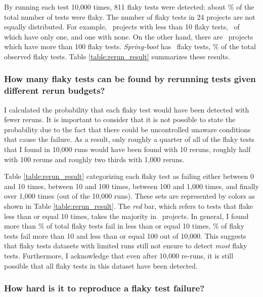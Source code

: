 By running each test 10,000 times, 811 flaky tests were detected: about \flakytestsrate\% of the total number of tests were flaky. The number of flaky tests in 24 projects are not equally distributed. For example, \projectsout~projects with less than 10 flaky tests, \projectsoneflaky~of which have only one, and one with none. On the other hand, there are \projectshundredsflaky~projects which have more than 100 flaky tests. \emph{Spring-boot} has \springbootFlaky~flaky tests, \highestflakyrate\% of the total observed flaky tests. Table \ref{table:rerun_result} summarizes these results. 

\subsubsection{How many flaky tests can be found by rerunning tests given different rerun budgets?} 
\label{FlakeFlaggerRQ1}

I calculated the probability that each flaky test would have been detected with fewer reruns. It is important to consider that it is not possible to state the probability due to the fact that there could be uncontrolled unaware conditions that cause the failure. As a result, only roughly a quarter of all of the flaky tests that I found in 10,000 runs would have been found with 10 reruns, roughly half with 100 reruns and roughly two thirds with 1,000 reruns.

Table \ref{table:rerun_result} categorizing each flaky test as failing either between 0 and 10 times, between 10 and 100 times, between 100 and 1,000 times, and finally over 1,000 times (out of the 10,000 runs).
These sets are represented by colors as shown in Table \ref{table:rerun_result}. The \emph{red} bar, which refers to tests that flake less than or equal 10 times, takes the majority in \redbarsratio~projects. 
In general, I found more than \NumFailingRunsTen\% of total flaky tests fail in less than or equal 10 times, \NumFailingRunsHundred\% of flaky tests fail more than 10 and less than or equal 100 out of 10,000.
This suggests that flaky tests datasets with limited runs still not ensure to detect \emph{most} flaky tests.
Furthermore, I acknowledge that even after 10,000 re-runs, it is still possible that all flaky tests in this dataset have been detected. 

\subsubsection{How hard is it to reproduce a flaky test failure?}
\label{FlakeFlaggerRQ2}

